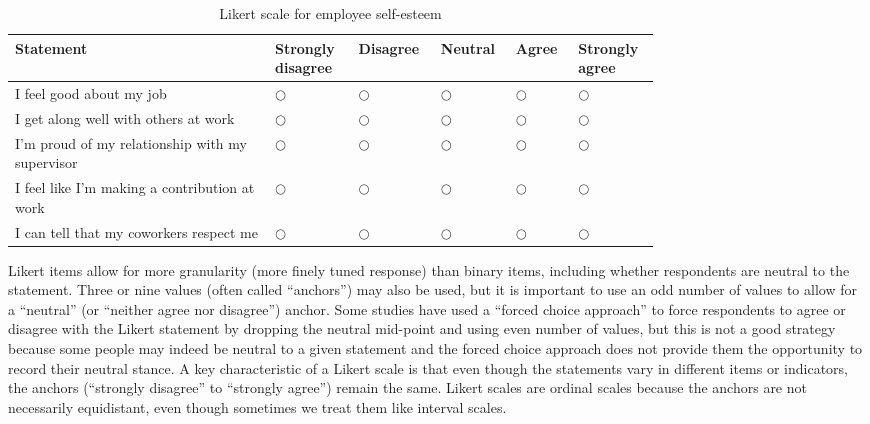 \begin{description}
	\begin{table}[H]
		\centering
		\begin{tabularx}{0.95\linewidth}{p{0.35\linewidth}p{0.10\linewidth}p{0.08\linewidth}p{0.07\linewidth}p{0.07\linewidth}p{0.08\linewidth}}
			\toprule
			{\footnotesize Statement} & {\footnotesize Strongly disagree} & {\footnotesize Disagree} & {\footnotesize Neutral} & {\footnotesize Agree} & {\footnotesize Strongly agree} \\
			\midrule
			{\footnotesize I feel good about my job} & $ \bigcirc $ & $ \bigcirc $ & $ \bigcirc $ & $ \bigcirc $ & $ \bigcirc $ \\
			{\footnotesize I get along well with others at work} & $ \bigcirc $ & $ \bigcirc $ & $ \bigcirc $ & $ \bigcirc $ & $ \bigcirc $ \\
			{\footnotesize I'm proud of my relationship with my supervisor} & $ \bigcirc $ & $ \bigcirc $ & $ \bigcirc $ & $ \bigcirc $ & $ \bigcirc $ \\
			{\footnotesize I feel like I'm making a contribution at work} & $ \bigcirc $ & $ \bigcirc $ & $ \bigcirc $ & $ \bigcirc $ & $ \bigcirc $ \\
			{\footnotesize I can tell that my coworkers respect me} & $ \bigcirc $ & $ \bigcirc $ & $ \bigcirc $ & $ \bigcirc $ & $ \bigcirc $ \\
			\bottomrule
		\end{tabularx}
		\caption{Likert scale for employee self-esteem}
		\label{tab06.03}
	\end{table}
	
	Likert items allow for more granularity (more finely tuned response) than binary items, including whether respondents are neutral to the statement. Three or nine values (often called ``anchors'') may also be used, but it is important to use an odd number of values to allow for a ``neutral'' (or ``neither agree nor disagree'') anchor. Some studies have used a ``forced choice approach'' to force respondents to agree or disagree with the Likert statement by dropping the neutral mid-point and using even number of values, but this is not a good strategy because some people may indeed be neutral to a given statement and the forced choice approach does not provide them the opportunity to record their neutral stance. A key characteristic of a Likert scale is that even though the statements vary in different items or indicators, the anchors (``strongly disagree'' to ``strongly agree'') remain the same. Likert scales are ordinal scales because the anchors are not necessarily equidistant, even though sometimes we treat them like interval scales.
	

\end{description}
